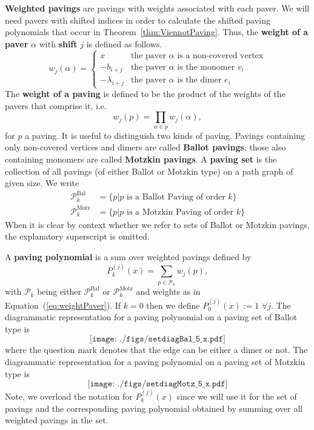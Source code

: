 \documentclass[11pt,a4paper]{article}
\newcommand{\la}{\lambda}
\newcommand{\defin}[1]{\textbf{#1}}		%
\newcommand{\df}{:=}
\begin{document}
\defin{Weighted pavings} are pavings with weights associated with each paver.
We will need pavers with shifted indices in order to calculate the shifted paving polynomials that occur in Theorem~\ref{thm:ViennotPaving}.
Thus, the \defin{weight of a paver} $\alpha$ with \defin{shift} $j$ is defined as follows. 
\begin{equation} \label{eq:weightPaver}
w_j(\alpha)=
\begin{cases}
x & \text{the paver $\alpha$ is a non-covered vertex}\\
-b_{i+j} & \text{the paver $\alpha$ is the monomer $v_i$}\\
-\la_{i+j} & \text{the paver $\alpha$ is the dimer $e_i$}
\end{cases}
\end{equation}
The \defin{weight of a paving} is defined to be the product of the weights of the pavers that comprise it, i.e.
\begin{equation}
w_j(p) = \prod_{\alpha \in p}w_j(\alpha),
\end{equation}
for $p$ a paving.  It is useful to distinguish two kinds of paving.
Pavings containing only non-covered vertices and dimers are called \defin{Ballot pavings}; those also containing monomers are called \defin{Motzkin pavings}.  A \defin{paving set} is the collection of all pavings (of either Ballot or Motzkin type) on a path graph of given size.  We write
\begin{align}
	\mathcal{P}^{\text{Bal}}_{k} &=  \{p | \text{$p$ is a Ballot Paving of order $k$}\}
	\label{eq:PavingSetBal}\\
	\mathcal{P}^{\text{Motz}}_{k} &=  \{p | \text{$p$ is a Motzkin Paving of order $k$}\}
	\label{eq:PavingSetMotz}
\end{align}
When it is clear by context whether we refer to sets of Ballot or Motzkin pavings, the explanatory superscript is omitted.


 
A \defin{paving polynomial} is a sum over weighted pavings defined by
\begin{equation} \label{eq:pavingPoly}
P_k^{(j)}(x) = \sum_{p \in \mathcal{P}_k} w_j(p),
\end{equation}
with $\mathcal{P}_k$   being either $\mathcal{P}^{\text{Bal}}_k$ or $\mathcal{P}^{\text{Motz}}_k$ and weights as in Equation~(\ref{eq:weightPaver}).  If $k=0$ then we define $P_0^{(j)}(x)\df 1$ $\forall j$. 
The diagrammatic representation for a paving polynomial on a  paving set of Ballot type is
\begin{equation} \label{eq:setdiagBal_5}
\texttt{[image: ./figs/setdiagBal\_5\_x.pdf]}
\end{equation}
where the question mark denotes that the edge can be either a dimer or not.
The diagrammatic representation for a paving polynomial on a   paving set of Motzkin type is 
\begin{equation} \label{eq:setdiagMotz_5}
\texttt{[image: ./figs/setdiagMotz\_5\_x.pdf]}
\end{equation}
Note, we overload the notation for $P_k^{(j)}(x)$ since we will use it for the set of pavings and the corresponding paving polynomial obtained by summing over all weighted pavings in the set.
\end{document}

